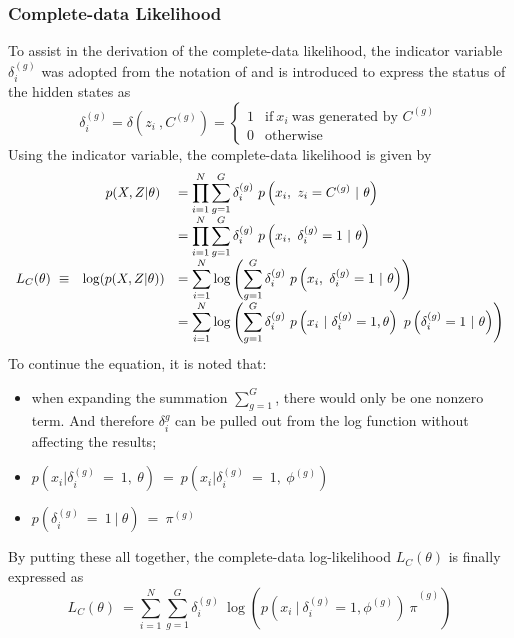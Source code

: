 \subsubsection{Complete-data Likelihood}
\label{sec:completedataLL}
To assist in the derivation of the complete-data likelihood, the indicator variable \(\delta_{i}^{(g)}\) was adopted from the notation of  and is introduced to express the status of the hidden states as
\begin{equation*}
    \delta ^{( g)}_{i} =\delta \left( z_{i} \ ,C^{( g)}\right) =\begin{cases}
    1 & \text{if} \ x_{i} \ \text{was generated by } C^{( g)}\\
    0 & \text{otherwise}
    \end{cases}
\end{equation*}
Using the indicator variable, the complete-data likelihood is given by
\begin{equation*}
    \begin{array}{ r r l }
     & p( X,Z|\theta ) \  & {\displaystyle =\prod ^{N}_{i=1}\sum ^{G}_{g=1} \delta ^{( g)}_{i} \ p\left( x_{i} ,\ z_{i} =C^{( g)} \ |\ \theta \right)}\\
     &  & {\displaystyle =\prod ^{N}_{i=1}\sum ^{G}_{g=1} \delta ^{( g)}_{i} \ p\left( x_{i} ,\ \delta ^{( g)}_{i} =1\ |\ \theta \right)}\\
    L_{C}( \theta ) \ \equiv  & \log( p( X,Z|\theta )) & {\displaystyle =\sum ^{N}_{i=1}\log\left(\sum ^{G}_{g=1} \delta ^{( g)}_{i} \ p\left( x_{i} ,\ \delta ^{( g)}_{i} =1\ |\ \theta \right)\right)}\\
     &  & {\displaystyle =\sum ^{N}_{i=1}\log\left(\sum ^{G}_{g=1} \delta ^{( g)}_{i} \ p\left( x_{i} \ |\ \delta ^{( g)}_{i} =1,\theta \right) \ p\left( \delta ^{( g)}_{i} =1\ |\ \theta \right)\right)}
    \end{array}
\end{equation*}
To continue the equation, it is noted that:
\begin{itemize}
    \item when expanding the summation \(\sum_{g=1}^{G}\), there would only be one nonzero term. And therefore \(\delta^{g}_i\) can be pulled out from the log function without affecting the results;
    \item $\displaystyle p\left( x_{i} |\delta ^{( g)}_{i} \ =\ 1,\ \theta \right) \ =\ p\left( x_{i} |\delta ^{( g)}_{i} \ =\ 1,\ \phi ^{( g)}\right)$
    \item $\displaystyle p\left( \delta ^{( g)}_{i} \ =\ 1\ |\ \theta \right) \ =\ \pi ^{( g)}$
\end{itemize}
By putting these all together, the complete-data log-likelihood $L_{C}( \theta )$ is finally expressed as
\begin{equation}
    L_{C}( \theta ) \ =\sum ^{N}_{i=1}\sum ^{G}_{g=1}{\displaystyle \delta ^{( g)}_{i} \ }\log\left({\displaystyle p\left( x_{i} \ |\ \delta ^{( g)}_{i} =1,\phi ^{( g)}\right) \ \pi }^{( g)}\right)
    \label{eq:completedataLL}
\end{equation}


